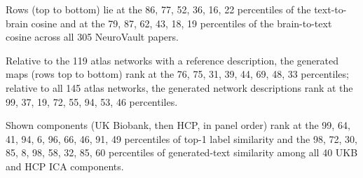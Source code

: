 Rows (top to bottom) lie at the 86, 77, 52, 36, 16, 22 percentiles of the text-to-brain cosine and at the 79, 87, 62, 43, 18, 19 percentiles of the brain-to-text cosine across all 305 NeuroVault papers.

Relative to the 119 atlas networks with a reference description, the generated maps (rows top to bottom) rank at the 76, 75, 31, 39, 44, 69, 48, 33 percentiles; relative to all 145 atlas networks, the generated network descriptions rank at the 99, 37, 19, 72, 55, 94, 53, 46 percentiles.

Shown components (UK Biobank, then HCP, in panel order) rank at the 99, 64, 41, 94, 6, 96, 66, 46, 91, 49 percentiles of top-1 label similarity and the 98, 72, 30, 85, 8, 98, 58, 32, 85, 60 percentiles of generated-text similarity among all 40 UKB and HCP ICA components.
